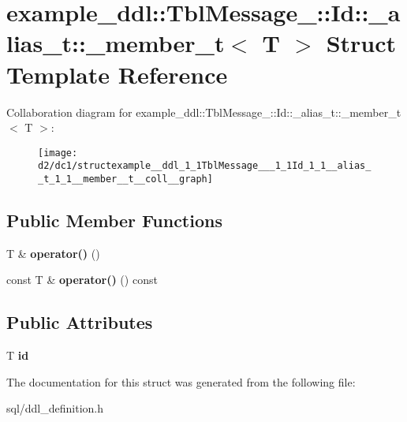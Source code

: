 \hypertarget{structexample__ddl_1_1TblMessage___1_1Id_1_1__alias__t_1_1__member__t}{}\section{example\+\_\+ddl\+:\+:Tbl\+Message\+\_\+\+:\+:Id\+:\+:\+\_\+alias\+\_\+t\+:\+:\+\_\+member\+\_\+t$<$ T $>$ Struct Template Reference}
\label{structexample__ddl_1_1TblMessage___1_1Id_1_1__alias__t_1_1__member__t}


Collaboration diagram for example\+\_\+ddl\+:\+:Tbl\+Message\+\_\+\+:\+:Id\+:\+:\+\_\+alias\+\_\+t\+:\+:\+\_\+member\+\_\+t$<$ T $>$\+:
\nopagebreak
\begin{figure}[H]
\begin{center}
\leavevmode
\texttt{[image: d2/dc1/structexample\_\_ddl\_1\_1TblMessage\_\_\_1\_1Id\_1\_1\_\_alias\_\_t\_1\_1\_\_member\_\_t\_\_coll\_\_graph]}
\end{center}
\end{figure}
\subsection*{Public Member Functions}
\begin{DoxyCompactItemize}
\item 
\hypertarget{structexample__ddl_1_1TblMessage___1_1Id_1_1__alias__t_1_1__member__t_a0902f6cc03d2f987ae50566faf96b739}{}T \& {\bfseries operator()} ()\label{structexample__ddl_1_1TblMessage___1_1Id_1_1__alias__t_1_1__member__t_a0902f6cc03d2f987ae50566faf96b739}

\item 
\hypertarget{structexample__ddl_1_1TblMessage___1_1Id_1_1__alias__t_1_1__member__t_ac0a8eccce907ad4eee953aad219bbc90}{}const T \& {\bfseries operator()} () const \label{structexample__ddl_1_1TblMessage___1_1Id_1_1__alias__t_1_1__member__t_ac0a8eccce907ad4eee953aad219bbc90}

\end{DoxyCompactItemize}
\subsection*{Public Attributes}
\begin{DoxyCompactItemize}
\item 
\hypertarget{structexample__ddl_1_1TblMessage___1_1Id_1_1__alias__t_1_1__member__t_ada6a8013dd64a226c44f84ea71e7d9f2}{}T {\bfseries id}\label{structexample__ddl_1_1TblMessage___1_1Id_1_1__alias__t_1_1__member__t_ada6a8013dd64a226c44f84ea71e7d9f2}

\end{DoxyCompactItemize}


The documentation for this struct was generated from the following file\+:\begin{DoxyCompactItemize}
\item 
sql/ddl\+\_\+definition.\+h\end{DoxyCompactItemize}
